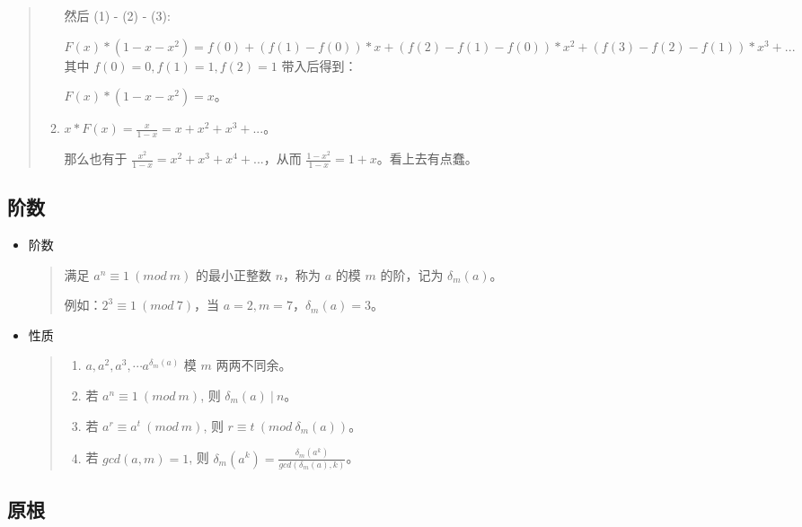 \documentclass[a4paper,12pt]{article}
\begin{document}
\begin{quote}
\begin{enumerate}
    然后 (1) - (2) - (3):

    \(F(x) * (1 - x - x^2) = f(0) + (f(1) - f(0)) * x + (f(2) - f(1) - f(0)) * x^2 + (f(3) - f(2) - f(1)) * x^3 + ...\) \\

    其中 \(f(0) = 0, f(1) = 1, f(2) = 1\) 带入后得到：

    \(F(x)*(1-x-x^2) = x\)。\\
\item
    \(x * F(x) = \frac{x}{1-x} = x + x^2 + x^3 + ...\)。

    那么也有于 \(\frac{x^2}{1-x} = x^2 + x^3 + x^4 + ...\)，从而
    \(\frac{1-x^2}{1-x} = 1 + x\)。看上去有点蠢。
\end{enumerate}

\end{quote}
    

\subsection{阶数}

\begin{itemize}
\item
    阶数
    \begin{quote}
    满足 \(a^n \equiv 1\ (mod \ m)\) 的最小正整数 \(n\)，称为 \(a\) 的模
    \(m\) 的阶，记为 \(\delta_m(a)\)。
    
    例如：\(2^3 \equiv 1\ (mod\ 7)\)，当
    \(a = 2, m = 7\)，\(\delta_m(a) = 3\)。
    \end{quote}
\item 
    性质
    \begin{quote}
    \begin{enumerate}
        \def\labelenumi{\arabic{enumi}.}
        \item 
            \(a, a^2, a^3, \cdots a^{\delta_m(a)}\) 模 \(m\) 两两不同余。
        \item 
            若 \(a^n \equiv 1 \ (mod \ m)\), 则 \(\delta_m(a) \ | \ n\)。
        \item 
            若 \(a^r \equiv a^t \ (mod \ m)\), 则 \(r \equiv t \ (mod \ \delta_m(a))\)。
        \item 
            若 \(gcd(a,m)=1\), 则 \(\delta_m(a^k) = \frac{\delta_m(a^k)}{gcd(\delta_m(a),k)}\)。
    \end{enumerate}        
    \end{quote}
\end{itemize}

\subsection{原根}
\end{document}
